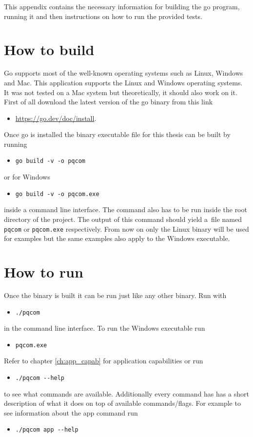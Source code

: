 This appendix contains the necessary information for building the go program, running it and then instructions on how to run the provided tests.

\section{How to build}
Go supports most of the well-known operating systems such as Linux, Windows and Mac. This application supports the Linux and Windows operating systems. It was not tested on a Mac system but theoretically, it should also work on it. First of all download the latest version of the go binary from this link
\begin{itemize}
  \item \url{https://go.dev/doc/install}.
\end{itemize}
Once go is installed the binary executable file for this thesis can be built by running
\begin{itemize}
  \item \texttt{go build -v -o pqcom}
\end{itemize}
or for Windows
\begin{itemize}
  \item \texttt{go build -v -o pqcom.exe}
\end{itemize}
inside a command line interface. The command also has to be run inside the root directory of the project. The output of this command should yield a~file named \texttt{pqcom} or \texttt{pqcom.exe} respectively. From now on only the Linux binary will be used for examples but the same examples also apply to the Windows executable.
\section{How to run}
Once the binary is built it can be run just like any other binary. Run with
\begin{itemize}
  \item \texttt{./pqcom}
\end{itemize}
in the command line interface. To run the Windows executable run
\begin{itemize}
  \item \texttt{pqcom.exe}
\end{itemize}
Refer to chapter \ref{ch:app_capab} for application capabilities or run
\begin{itemize}
  \item \texttt{./pqcom -\--help}
\end{itemize}
to see what commands are available. Additionally every command has has a short description of what it does on top of available commands/flags. For example to see information about the app command run
\begin{itemize}
  \item \texttt{./pqcom app -\--help}
\end{itemize}

